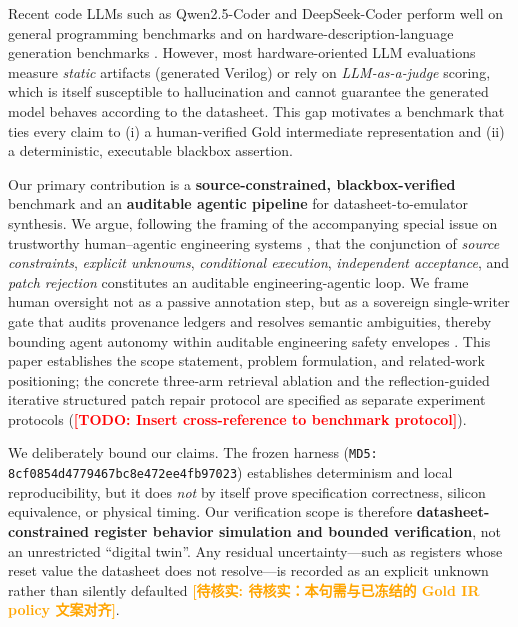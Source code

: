 \documentclass[preprint,review]{elsarticle}
\theoremstyle{definition}
\newcommand{\todo}[1]{\textcolor{red}{\textbf{[TODO: #1]}}}
\newcommand{\unverified}[1]{\textcolor{orange}{\textbf{[待核实: #1]}}}
\begin{document}
Recent code LLMs such as Qwen2.5-Coder \cite{hui2024qwen25coder} and DeepSeek-Coder
\cite{guo2024deepseekcoder} perform well on general programming benchmarks
\cite{chen2021evaluating,jimenez2024swebench} and on hardware-description-language
generation benchmarks \cite{thakur2023verilogeval,lu2024rtllm,liu2023chipnemo}. However, most
hardware-oriented LLM evaluations measure \emph{static} artifacts (generated Verilog) or
rely on \emph{LLM-as-a-judge} scoring, which is itself susceptible to hallucination and
cannot guarantee the generated model behaves according to the datasheet. This gap
motivates a benchmark that ties every claim to (i) a human-verified Gold intermediate
representation and (ii) a deterministic, executable blackbox assertion.

Our primary contribution is a {\bfseries source-constrained, blackbox-verified} benchmark
and an {\bfseries auditable agentic pipeline} for datasheet-to-emulator synthesis. We
argue, following the framing of the accompanying special issue on trustworthy
human--agentic engineering systems \cite{trappey2026human,trappey2024how}, that the conjunction of {\em source constraints},
{\em explicit unknowns}, {\em conditional execution}, {\em independent acceptance}, and
{\em patch rejection} constitutes an auditable engineering-agentic loop. We frame human
oversight not as a passive annotation step, but as a sovereign single-writer gate that
audits provenance ledgers and resolves semantic ambiguities, thereby bounding agent
autonomy within auditable engineering safety envelopes \cite{zhou2025examining}. This paper establishes the
scope statement, problem formulation, and related-work positioning; the concrete
three-arm retrieval ablation and the reflection-guided iterative structured patch repair
protocol are specified as separate experiment protocols
(\todo{Insert cross-reference to benchmark protocol}).

We deliberately bound our claims. The frozen harness (\texttt{MD5:
8cf0854d4779467bc8e472ee4fb97023}) establishes determinism and local reproducibility, but
it does {\em not} by itself prove specification correctness, silicon equivalence, or
physical timing. Our verification scope is therefore {\bfseries datasheet-constrained
register behavior simulation and bounded verification}, not an unrestricted ``digital
twin''. Any residual uncertainty---such as registers whose reset value the datasheet does
not resolve---is recorded as an explicit unknown rather than silently defaulted
\unverified{待核实：本句需与已冻结的 Gold IR policy 文案对齐}.
\end{document}
